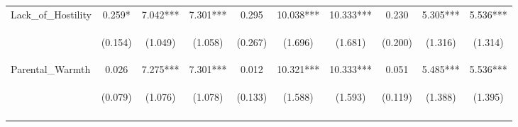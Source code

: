 \begin{tabular}{lccccccccc}
\noalign{\smallskip}Lack_of_Hostility & 0.259* & 7.042*** & 7.301*** & 0.295 & 10.038*** & 10.333*** & 0.230 & 5.305*** & 5.536***\\
 & \begin{footnotesize}(0.154)\end{footnotesize} & \begin{footnotesize}(1.049)\end{footnotesize} & \begin{footnotesize}(1.058)\end{footnotesize} & \begin{footnotesize}(0.267)\end{footnotesize} & \begin{footnotesize}(1.696)\end{footnotesize} & \begin{footnotesize}(1.681)\end{footnotesize} & \begin{footnotesize}(0.200)\end{footnotesize} & \begin{footnotesize}(1.316)\end{footnotesize} & \begin{footnotesize}(1.314)\end{footnotesize}\\
\noalign{\smallskip}Parental_Warmth & 0.026 & 7.275*** & 7.301*** & 0.012 & 10.321*** & 10.333*** & 0.051 & 5.485*** & 5.536***\\
 & \begin{footnotesize}(0.079)\end{footnotesize} & \begin{footnotesize}(1.076)\end{footnotesize} & \begin{footnotesize}(1.078)\end{footnotesize} & \begin{footnotesize}(0.133)\end{footnotesize} & \begin{footnotesize}(1.588)\end{footnotesize} & \begin{footnotesize}(1.593)\end{footnotesize} & \begin{footnotesize}(0.119)\end{footnotesize} & \begin{footnotesize}(1.388)\end{footnotesize} & \begin{footnotesize}(1.395)\end{footnotesize}\\
\noalign{\smallskip}\hline\end{tabular}\\
